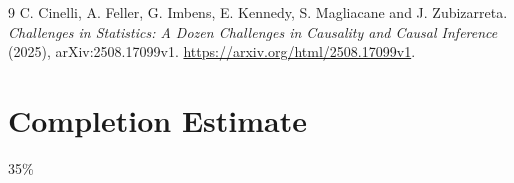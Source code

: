\documentclass[11pt]{article}
\theoremstyle{definition}
\begin{document}
\begin{thebibliography}{9}
 C. Cinelli, A. Feller, G. Imbens, E. Kennedy, S. Magliacane and J. Zubizarreta.
\emph{Challenges in Statistics: A Dozen Challenges in Causality and Causal Inference} (2025), arXiv:2508.17099v1.
\url{https://arxiv.org/html/2508.17099v1}.
\end{thebibliography}
\section{Completion Estimate}
35\%
\end{document}
